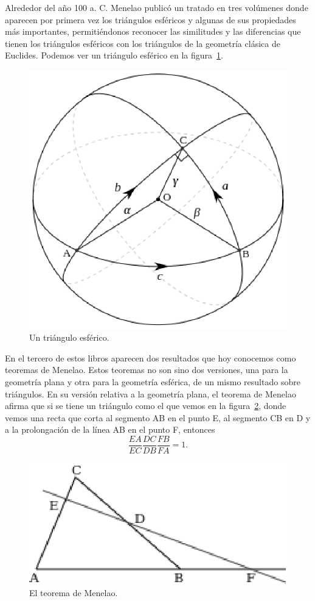 Alrededor del año 100 a. C. Menelao publicó un tratado en tres volúmenes donde
aparecen por primera vez los triángulos esféricos y algunas de sus propiedades
más importantes, permitiéndonos reconocer las similitudes y las diferencias que
tienen los triángulos esféricos con los triángulos de la geometría clásica de
Euclides.  Podemos ver un triángulo esférico en la figura~\ref{fig:esferico}.

\begin{figure}[h]
   \centering
   \includegraphics[scale=0.4]{images/esferico}
   \caption{Un triángulo esférico.}
   \label{fig:esferico}
\end{figure}

En el tercero de estos libros aparecen dos resultados que hoy conocemos como teoremas de
Menelao. Estos teoremas no son sino dos versiones, una para la geometría plana y otra para
la geometría esférica, de un mismo resultado sobre triángulos.  En su versión
relativa a la geometría plana, el teorema de Menelao afirma que si se tiene un
triángulo como el que vemos en la figura~\ref{fig:Menelao}, donde vemos una
recta que corta al segmento AB en el punto E, al segmento CB en D y a la
prolongación de la línea AB en el punto F, entonces 
\[
	\frac{EA}{EC}\frac{DC}{DB}\frac{FB}{FA}=1.
\]

\begin{figure}[h]
   \centering
   \includegraphics[scale=0.7]{images/menelao}
   \caption{El teorema de Menelao.}
   \label{fig:Menelao}
\end{figure}

